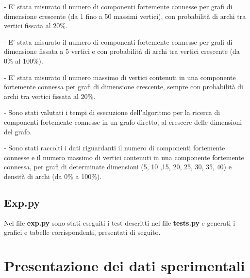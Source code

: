 \documentclass[a4paper,12pt]{article}
\begin{document}
- E' stata misurato il numero di componenti fortemente connesse per grafi di dimensione crescente (da 1 fino a 50 massimi vertici), con probabilità di archi tra vertici fissata al 20\%.
\newline

- E' stata misurato il numero di componenti fortemente connesse per grafi di dimensione fissata a 5 vertici e con probabilità di archi tra vertici crescente (da 0\% al 100\%).
\newline

- E' stata misurato il numero massimo di vertici contenuti in una componente fortemente connessa per grafi di dimensione crescente, sempre con probabilità di archi tra vertici fissata al 20\%.
\newline

- Sono stati valutati i tempi di esecuzione dell'algoritmo per la ricerca di componenti fortemente connesse in un grafo diretto, al crescere delle dimensioni del grafo.
\newline

- Sono stati raccolti i dati riguardanti il numero di componenti fortemente connesse e il numero massimo di vertici contenuti in una componente fortemente connessa, per grafi di determinate dimensioni (5, 10 ,15, 20, 25, 30, 35, 40) e densità di archi (da 0\% a 100\%).

\subsection{Exp.py}
Nel file \textbf{exp.py} sono stati eseguiti i test descritti nel file \textbf{tests.py} e generati i grafici e tabelle corrispondenti, presentati di seguito.

\clearpage
\section{Presentazione dei dati sperimentali}
\end{document}

